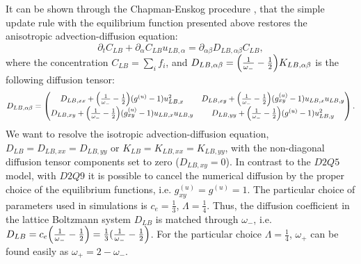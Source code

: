 \documentclass[review,12pt]{elsarticle}
\newcommand{\beq}{\begin{equation}}
\newcommand{\feq}{\end{equation}}
\newcommand{\omegaplus}{\omega_{+}}
\newcommand{\omegaminus}{\omega_{-}}
\begin{document}
It can be shown through the Chapman-Enskog procedure \cite{chapman}, that the simple update rule
with the equilibrium function presented above restores the anisotropic
advection-diffusion equation:
\beq
\partial_t C_{LB}+ \partial_{\alpha} C_{LB} u_{LB,\alpha}=\partial_{\alpha\beta} D_{LB,\alpha\beta} C_{LB},
\feq
where the concentration $C_{LB}=\sum_i{f_i}$, and $D_{LB,\alpha\beta}=\Bigl(\frac{1}{\omegaminus}-\frac{1}{2}\Bigr)K_{LB,\alpha\beta}$ is the
following diffusion tensor:
\begin{equation}
D_{LB,\alpha\beta}=
\begin{pmatrix}
D_{LB,xx} + \Bigl(\frac{1}{\omegaminus}-\frac{1}{2}\Bigr)(g^{(u)}-1) u_{LB,x}^2 &
D_{LB,xy}+\Bigl(\frac{1}{\omegaminus}-\frac{1}{2}\Bigr)(g_{xy}^{(u)}-1)u_{LB,x} u_{LB,y}\\
D_{LB,xy} + \Bigl(\frac{1}{\omegaminus}-\frac{1}{2}\Bigr)(g_{xy}^{(u)}-1) u_{LB,x} u_{LB,y}&
D_{LB,yy}+\Bigl(\frac{1}{\omegaminus}-\frac{1}{2}\Bigr)(g^{(u)}-1) u_{LB,y}^2
\end{pmatrix}.
\end{equation}
We want to resolve the isotropic advection-diffusion equation, $D_{LB}=D_{LB,xx}=D_{LB,yy}$ or
$K_{LB}=K_{LB,xx}=K_{LB,yy}$, with the non-diagonal diffusion tensor components set to zero ($D_{LB,xy}=0$). In
contrast to the $D2Q5$ model, with $D2Q9$ it is
possible to cancel the numerical diffusion by the proper choice
of the equilibrium functions, i.e. $g_{xy}^{(u)}=g^{(u)}=1$.  The particular choice of parameters
used in simulations is $c_e=\frac{1}{3}$, $\Lambda=\frac{1}{4}$. Thus, the diffusion coefficient {\color{red} in the lattice Boltzmann system} $D_{LB}$
is matched through $\omegaminus$, i.e. $D_{LB}=c_e
\Bigl(\frac{1}{\omegaminus}-\frac{1}{2}\Bigr)=\frac{1}{3}(\frac{1}{\omegaminus}-\frac{1}{2}\Bigr)$.
For the particular choice $\Lambda=\frac{1}{4}$, $\omegaplus$ can be found easily as
 $\omegaplus=2-\omegaminus$.  

\end{document}
